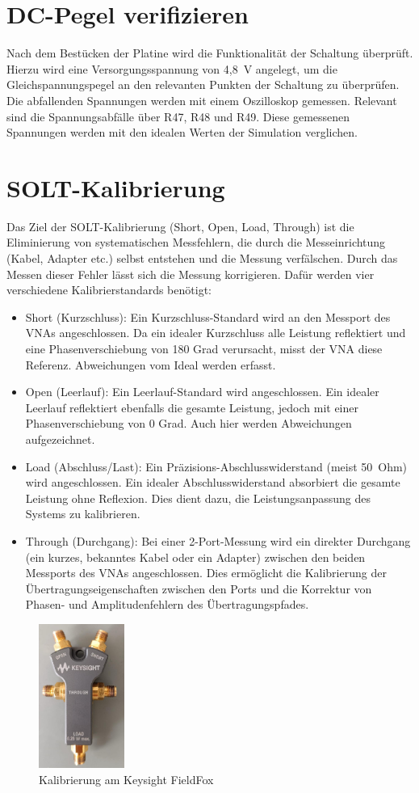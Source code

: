 \section{DC-Pegel verifizieren}
Nach dem Bestücken der Platine wird die Funktionalität der Schaltung überprüft. Hierzu wird eine Versorgungsspannung von 4,8~V angelegt, um die Gleichspannungspegel an den relevanten Punkten der Schaltung zu überprüfen. Die abfallenden Spannungen werden mit einem Oszilloskop gemessen. Relevant sind die Spannungsabfälle über R47, R48 und R49. Diese gemessenen Spannungen werden mit den idealen Werten der Simulation verglichen.
\clearpage
\section{SOLT-Kalibrierung}
Das Ziel der SOLT-Kalibrierung (Short, Open, Load, Through) ist die Eliminierung von systematischen Messfehlern, die durch die Messeinrichtung (Kabel, Adapter etc.) selbst entstehen und die Messung verfälschen.
Durch das Messen dieser Fehler lässt sich die Messung korrigieren.
Dafür werden vier verschiedene Kalibrierstandards benötigt:
\begin{itemize}
    \item Short (Kurzschluss): Ein Kurzschluss-Standard wird an den Messport des VNAs angeschlossen. Da ein idealer Kurzschluss alle Leistung reflektiert und eine Phasenverschiebung von 180 Grad verursacht, misst der VNA diese Referenz. Abweichungen vom Ideal werden erfasst.
    \item Open (Leerlauf): Ein Leerlauf-Standard wird angeschlossen. Ein idealer Leerlauf reflektiert ebenfalls die gesamte Leistung, jedoch mit einer Phasenverschiebung von 0 Grad. Auch hier werden Abweichungen aufgezeichnet.
    \item Load (Abschluss/Last): Ein Präzisions-Abschlusswiderstand (meist 50~Ohm) wird angeschlossen. Ein idealer Abschlusswiderstand absorbiert die gesamte Leistung ohne Reflexion. Dies dient dazu, die Leistungsanpassung des Systems zu kalibrieren.
    \item Through (Durchgang): Bei einer 2-Port-Messung wird ein direkter Durchgang (ein kurzes, bekanntes Kabel oder ein Adapter) zwischen den beiden Messports des VNAs angeschlossen. Dies ermöglicht die Kalibrierung der Übertragungseigenschaften zwischen den Ports und die Korrektur von Phasen- und Amplitudenfehlern des Übertragungspfades.
\end{itemize}
\begin{figure}[h]
    \centering
    \includegraphics[width=0.25\textwidth]{Pictures/Keysightkallibrierung.jpg}
    \caption{Kalibrierung am Keysight FieldFox}
\end{figure}
\clearpage

